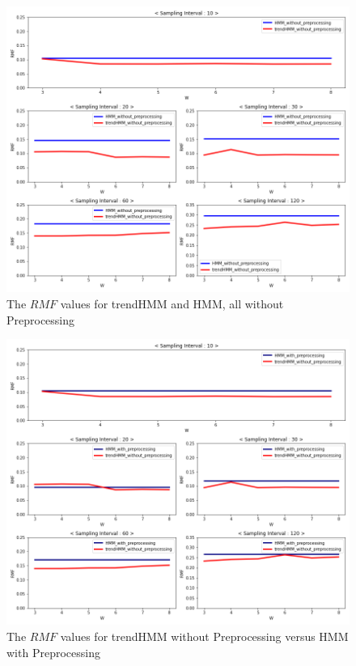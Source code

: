 \documentclass[preprint,12pt]{elsarticle}
\begin{document}
\begin{figure}
	\centering
	\includegraphics[height=0.99\textwidth]{images/trendHMM_unpreprocessing_and_HMM_unpreprocessing_0.png}
	\caption{The $RMF$ values for trendHMM and HMM, all without Preprocessing}
	\label{fig:fig7}
\end{figure}
\begin{figure}
	\centering
	\includegraphics[height=0.99\textwidth]{images/trendHMM_unpreprocessing_and_HMM_preprocessing_0.png}
	\caption{The $RMF$ values for trendHMM without Preprocessing versus HMM with Preprocessing}
	\label{fig:fig8}
\end{figure}
\end{document}
